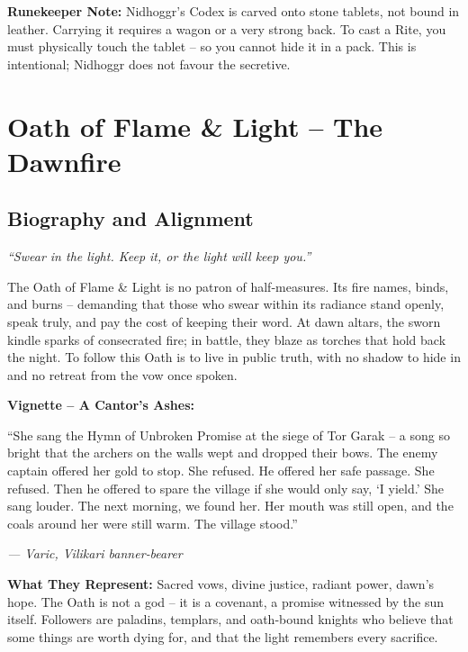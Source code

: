 \documentclass[10pt,a5paper]{book}
\begin{document}
\noindent \textbf{Runekeeper Note:} Nidhoggr’s Codex is carved onto stone tablets, not bound in leather. Carrying it requires a wagon or a very strong back. To cast a Rite, you must physically touch the tablet – so you cannot hide it in a pack. This is intentional; Nidhoggr does not favour the secretive.

\clearpage


\section{Oath of Flame \& Light – The Dawnfire}
\label{patron:oathflame}

\subsection*{Biography and Alignment}

\textit{“Swear in the light. Keep it, or the light will keep you.”}

The Oath of Flame & Light is no patron of half‑measures. Its fire names, binds, and burns – demanding that those who swear within its radiance stand openly, speak truly, and pay the cost of keeping their word. At dawn altars, the sworn kindle sparks of consecrated fire; in battle, they blaze as torches that hold back the night. To follow this Oath is to live in public truth, with no shadow to hide in and no retreat from the vow once spoken.

\textbf{Vignette – A Cantor’s Ashes:}
\epigraph{“She sang the Hymn of Unbroken Promise at the siege of Tor Garak – a song so bright that the archers on the walls wept and dropped their bows. The enemy captain offered her gold to stop. She refused. He offered her safe passage. She refused. Then he offered to spare the village if she would only say, ‘I yield.’ She sang louder. The next morning, we found her. Her mouth was still open, and the coals around her were still warm. The village stood.”}{\textit{— Varic, Vilikari banner‑bearer}}

\textbf{What They Represent:} Sacred vows, divine justice, radiant power, dawn’s hope. The Oath is not a god – it is a covenant, a promise witnessed by the sun itself. Followers are paladins, templars, and oath‑bound knights who believe that some things are worth dying for, and that the light remembers every sacrifice.
\end{document}
